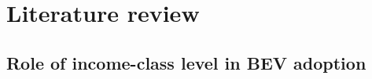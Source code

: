 \documentclass[preprint,review,11pt, authoryear]{elsarticle}
\begin{document}
    
    
    
    

\section{Literature review}

    

    \subsection{Role of income-class level in BEV adoption}
\end{document}

